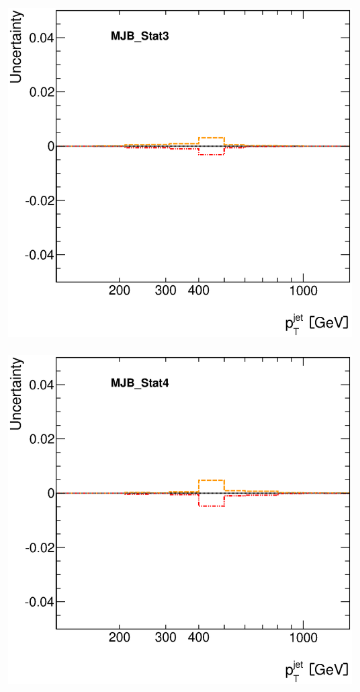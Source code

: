 \documentclass[12pt, twoside]{article}
\numberwithin{equation}{section}
\numberwithin{figure}{section}
\newenvironment{changemargin}[2]{%
\begin{list}{}{%
\setlength{\topsep}{0pt}%
\setlength{\leftmargin}{#1}%
\setlength{\rightmargin}{#2}%
\setlength{\listparindent}{\parindent}%
\setlength{\itemindent}{\parindent}%
\setlength{\parsep}{\parskip}%
}%
\item[]}{\end{list}}
\begin{document}
\begin{figure}[H]
\begin{changemargin}{-1.0cm}{-0.75cm}
\begin{changemargin}{-0.75cm}{-1.0cm}
        \begin{subfigure}[b]{0.25\textwidth}
            \includegraphics[width=\textwidth]{./images/JetSystematics/JetSystematic-29.eps}
        \end{subfigure}
        \begin{subfigure}[b]{0.25\textwidth}
            \includegraphics[width=\textwidth]{./images/JetSystematics/JetSystematic-30.eps}

\end{subfigure}
\end{changemargin}
\end{changemargin}
\end{figure}
\end{document}
